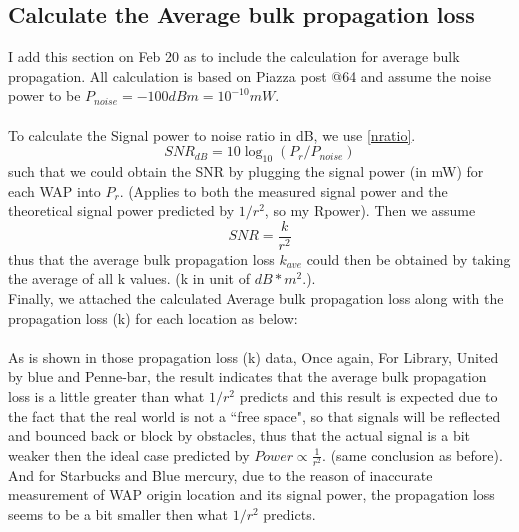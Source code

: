 \documentclass[usletter,12pt]{article}
\begin{document}
\clearpage
\subsection{Calculate the Average bulk propagation loss}
I add this section on Feb 20 as to include the calculation for average bulk propagation. All calculation is based on Piazza post @64 and assume the noise power to be $P_{noise} = -100dBm = 10^{-10} mW$.\\\\
To calculate the Signal power to noise ratio in dB, we use \autoref{nratio}.\\
\begin{equation}
SNR_{dB} = 10\log_{10}(P_{r}/P_{noise})
\label{nratio}
\end{equation}
such that we could obtain the SNR by plugging the signal power (in mW) for each WAP into $P_{r}$. (Applies to both the measured signal power and the theoretical signal power predicted by $1/r^2$, so my Rpower). Then we assume\\
\begin{equation}
SNR = \frac{k}{r^2}
\end{equation} 
thus that the average bulk propagation loss $k_{ave}$ could then be obtained by taking the average of all k values. (k in unit of $dB*m^2$.).\\Finally, we attached the calculated Average bulk propagation loss along with the propagation loss (k) for each location as below:\\\\





As is shown in those propagation loss (k) data, Once again, For Library, United by blue and Penne-bar, the result indicates that the average bulk propagation loss is a little greater than what $1/r^2$ predicts and this result is expected due to the fact that the real world is not a ``free space", so that signals will be reflected and bounced back or block by obstacles, thus that the actual signal is a bit weaker then the ideal case predicted by $Power \propto \frac{1}{r^2}$. (same conclusion as before). And for Starbucks and Blue mercury, due to the reason of inaccurate measurement of WAP origin location and its signal power, the propagation loss seems to be a bit smaller then what $1/r^2$ predicts.
\end{document}
